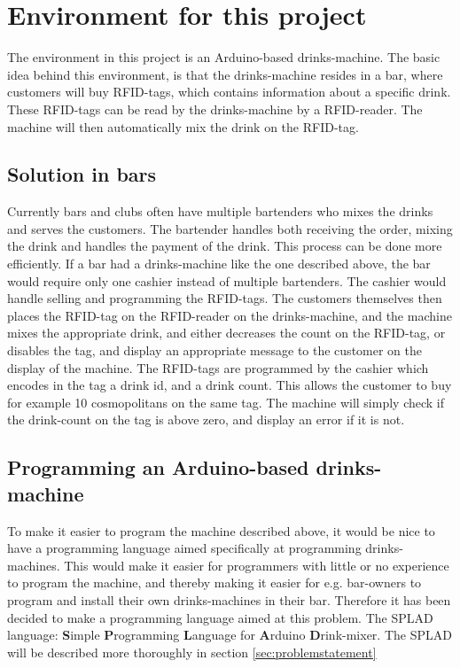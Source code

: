 \section{Environment for this project}
The environment in this project is an Arduino-based drinks-machine. The basic idea behind this environment, is that the drinks-machine resides in a bar, where customers will buy RFID-tags, which contains information about a specific drink. These RFID-tags can be read by the drinks-machine by a RFID-reader. The machine will then automatically mix the drink on the RFID-tag.

\subsection{Solution in bars}
Currently bars and clubs often have multiple bartenders who mixes the drinks and serves the customers. The bartender handles both receiving the order, mixing the drink and handles the payment of the drink. This process can be done more efficiently. If a bar had a drinks-machine like the one described above, the bar would require only one cashier instead of multiple bartenders. The cashier would handle selling and programming the RFID-tags. The customers themselves then places the RFID-tag on the RFID-reader on the drinks-machine, and the machine mixes the appropriate drink, and either decreases the count on the RFID-tag, or disables the tag, and display an appropriate message to the customer on the display of the machine. The RFID-tags are programmed by the cashier which encodes in the tag a drink id, and a drink count. This allows the customer to buy for example 10 cosmopolitans on the same tag. The machine will simply check if the drink-count on the tag is above zero, and display an error if it is not.

\subsection{Programming an Arduino-based drinks-machine}
To make it easier to program the machine described above, it would be nice to have a programming language aimed specifically at programming drinks-machines. This would make it easier for programmers with little or no experience to program the machine, and thereby making it easier for e.g. bar-owners to program and install their own drinks-machines in their bar. Therefore it has been decided to make a programming language aimed at this problem. The SPLAD language: \textbf{S}imple \textbf{P}rogramming \textbf{L}anguage for \textbf{A}rduino \textbf{D}rink-mixer. The SPLAD will be described more thoroughly in section \ref{sec:problemstatement}